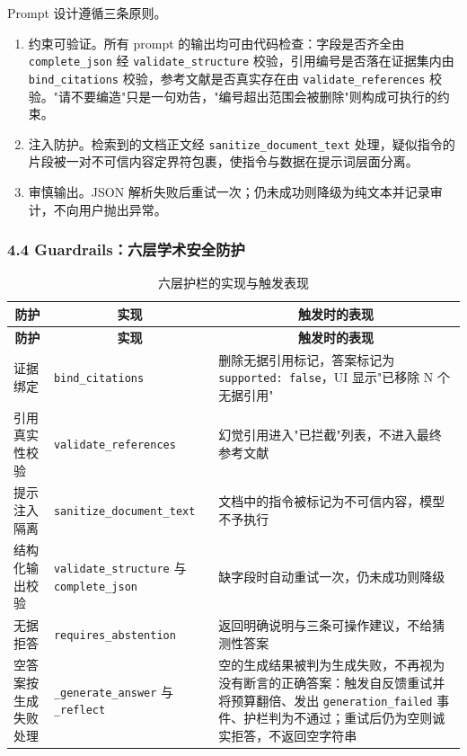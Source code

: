 \documentclass[UTF8,fontset=windows,zihao=5,a4paper]{ctexart}
\begin{document}
Prompt 设计遵循三条原则。

\begin{enumerate}
\item 约束可验证。所有 prompt 的输出均可由代码检查：字段是否齐全由 \texttt{complete\_\allowbreak{}json} 经 \texttt{validate\_\allowbreak{}structure} 校验，引用编号是否落在证据集内由 \texttt{bind\_\allowbreak{}citations} 校验，参考文献是否真实存在由 \texttt{validate\_\allowbreak{}references} 校验。"请不要编造"只是一句劝告，"编号超出范围会被删除"则构成可执行的约束。
\item 注入防护。检索到的文档正文经 \texttt{sanitize\_\allowbreak{}document\_\allowbreak{}text} 处理，疑似指令的片段被一对不可信内容定界符包裹，使指令与数据在提示词层面分离。
\item 审慎输出。JSON 解析失败后重试一次；仍未成功则降级为纯文本并记录审计，不向用户抛出异常。
\end{enumerate}

\subsubsection*{4.4 Guardrails：六层学术安全防护}
\begin{longtable}{@{}p{}p{}p{}@{}}
\caption{六层护栏的实现与触发表现}\\
\toprule
\multicolumn{1}{c}{\textbf{防护}} & \multicolumn{1}{c}{\textbf{实现}} & \multicolumn{1}{c}{\textbf{触发时的表现}} \\
\midrule
\endfirsthead
\toprule
\multicolumn{1}{c}{\textbf{防护}} & \multicolumn{1}{c}{\textbf{实现}} & \multicolumn{1}{c}{\textbf{触发时的表现}} \\
\midrule
\endhead
\bottomrule
\endfoot
证据绑定 & \texttt{bind\_\allowbreak{}citations} & 删除无据引用标记，答案标记为 \texttt{supported: false}，UI 显示"已移除 N 个无据引用" \\
引用真实性校验 & \texttt{validate\_\allowbreak{}references} & 幻觉引用进入"已拦截"列表，不进入最终参考文献 \\
提示注入隔离 & \texttt{sanitize\_\allowbreak{}document\_\allowbreak{}text} & 文档中的指令被标记为不可信内容，模型不予执行 \\
结构化输出校验 & \texttt{validate\_\allowbreak{}structure} 与 \texttt{complete\_\allowbreak{}json} & 缺字段时自动重试一次，仍未成功则降级 \\
无据拒答 & \texttt{requires\_\allowbreak{}abstention} & 返回明确说明与三条可操作建议，不给猜测性答案 \\
空答案按生成失败处理 & \texttt{\_\allowbreak{}generate\_\allowbreak{}answer} 与 \texttt{\_\allowbreak{}reflect} & 空的生成结果被判为生成失败，不再视为没有断言的正确答案：触发自反馈重试并将预算翻倍、发出 \texttt{generation\_\allowbreak{}failed} 事件、护栏判为不通过；重试后仍为空则诚实拒答，不返回空字符串 \\
\end{longtable}
\end{document}
